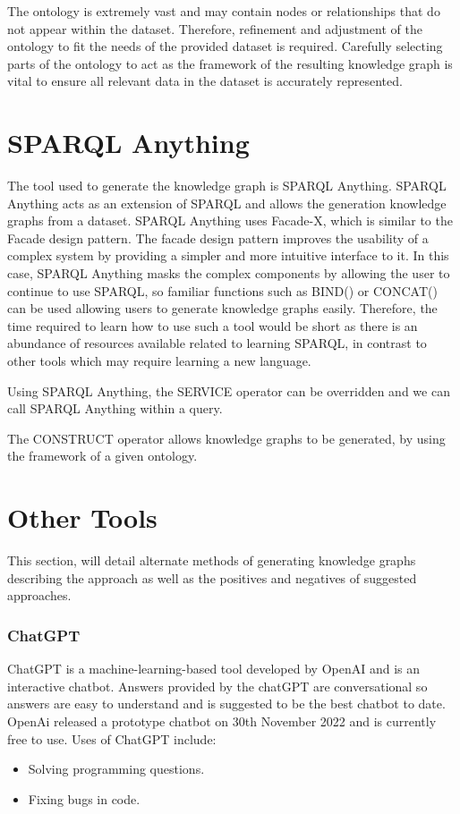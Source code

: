 The ontology is extremely vast and may contain nodes or relationships that do not appear within the dataset. Therefore, refinement and adjustment of the ontology to fit the needs of the provided dataset is required. Carefully selecting parts of the ontology to act as the framework of the resulting knowledge graph is vital to ensure all relevant data in the dataset is accurately represented. 

\section{SPARQL Anything}
\hspace{0.5cm} The tool used to generate the knowledge graph is SPARQL Anything. SPARQL Anything acts as an extension of SPARQL and allows the generation knowledge graphs from a dataset. SPARQL Anything uses Facade-X, which is similar to the Facade design pattern. The facade design pattern improves the usability of a complex system by providing a simpler and more intuitive interface to it. In this case, SPARQL Anything masks the complex components by allowing the user to continue to use SPARQL, so familiar functions such as BIND() or CONCAT() can be used allowing users to generate knowledge graphs easily. Therefore, the time required to learn how to use such a tool would be short as there is an abundance of resources available related to learning SPARQL, in contrast to other tools which may require learning a new language. 

Using SPARQL Anything, the SERVICE operator can be overridden and we can call SPARQL Anything within a query. \cite{sparqlanything}

The CONSTRUCT operator allows knowledge graphs to be generated, by using the framework of a given ontology. \cite{sparqlanythinggithub}

\section{Other Tools}

\hspace{0.5cm} This section, will detail alternate methods of generating knowledge graphs describing the approach as well as the positives and negatives of suggested approaches.

\subsubsection{ChatGPT}
\hspace{0.5cm}  ChatGPT is a machine-learning-based tool developed by OpenAI and is an interactive chatbot. Answers provided by the chatGPT are conversational so answers are easy to understand and is suggested to be the best chatbot to date. \cite{chatgpt} OpenAi released a prototype chatbot on 30th November 2022 and is currently free to use. Uses of ChatGPT include:
\begin{itemize}
    \itemsep0em 
\item Solving programming questions.
\item Fixing bugs in code.
\end{itemize}

